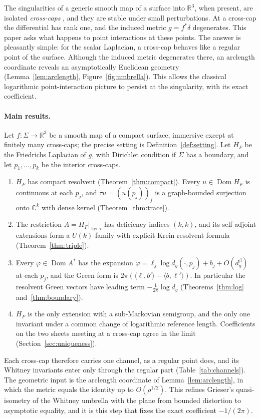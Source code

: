 \documentclass[11pt]{article}
\theoremstyle{definition}\newtheorem{definition}[theorem]{Definition}
\theoremstyle{remark}\newtheorem{remark}[theorem]{Remark}
\newcommand{\R}{\mathbb R}\newcommand{\C}{\mathbb C}\newcommand{\Z}{\mathbb Z}
\newcommand{\Dom}{\operatorname{Dom}}\newcommand{\dd}{\,d}
\begin{document}
The singularities of a generic smooth map of a surface into $\R^3$, when
present, are isolated \emph{cross-caps} \cite{whitney44,gg}, and they are stable
under small perturbations. At a cross-cap the differential has rank one, and
the induced metric $g=f^*\delta$ degenerates. This paper asks what happens to
point interactions at these points. The answer is pleasantly simple: for the
scalar Laplacian, a cross-cap behaves like a regular point of the surface.
Although the induced metric degenerates there, an arclength coordinate reveals
an asymptotically Euclidean geometry (Lemma~\ref{lem:arclength},
Figure~\ref{fig:umbrella}). This allows the classical logarithmic
point-interaction picture to persist at the singularity, with its exact
coefficient.

\paragraph{Main results.} Let $f:\Sigma\to\R^3$ be a smooth map of a compact
surface, immersive except at finitely many cross-caps; the precise setting is
Definition~\ref{def:setting}. Let $H_F$ be the Friedrichs Laplacian of $g$,
with Dirichlet condition if $\Sigma$ has a boundary, and let $p_1,\dots,p_k$ be
the interior cross-caps.
\begin{enumerate}
\item $H_F$ has compact resolvent (Theorem~\ref{thm:compact}). Every
$u\in\Dom H_F$ is continuous at each $p_j$, and $\tau u=(u(p_j))_j$ is a
graph-bounded surjection onto $\C^k$ with dense kernel
(Theorem~\ref{thm:trace}).
\item The restriction $A=H_F|_{\ker\tau}$ has deficiency indices $(k,k)$, and
its self-adjoint extensions form a $U(k)$-family with explicit Krein resolvent
formula (Theorem~\ref{thm:triple}).
\item Every $\varphi\in\Dom A^*$ has the expansion
$\varphi=\ell_j\log d_g(\cdot,p_j)+b_j+O(d_g^\beta)$ at each $p_j$, and the Green
form is $2\pi(\langle\ell,b'\rangle-\langle b,\ell'\rangle)$. In particular the
resolvent Green vectors have leading term $-\frac1{2\pi}\log d_g$
(Theorems~\ref{thm:log} and~\ref{thm:boundary}).
\item $H_F$ is the only extension with a sub-Markovian semigroup, and the only
one invariant under a common change of logarithmic reference length.
Coefficients on the two sheets meeting at a cross-cap agree in the limit
(Section~\ref{sec:uniqueness}).
\end{enumerate}
Each cross-cap therefore carries one channel, as a regular point does, and
its Whitney invariants enter only through the regular part
(Table~\ref{tab:channels}). The geometric input is the arclength coordinate of
Lemma~\ref{lem:arclength}, in which the metric equals the identity up to
$O(\rho^{1/2})$. This refines Grieser's quasi-isometry of the Whitney umbrella
with the plane \cite{grieser} from bounded distortion to asymptotic equality,
and it is this step that fixes the exact coefficient $-1/(2\pi)$.
\end{document}

